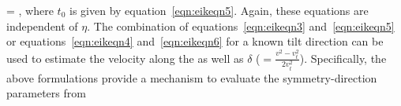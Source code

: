 \beqa
{} =  ,
\label{eqn:eikeqn6}
\eeqa
where $t_0$ is given by equation~\ref{eqn:eikeqn5}.
Again, these equations are independent of $\eta$. The combination of equations~\ref{eqn:eikeqn3} and~\ref{eqn:eikeqn5}
or equations~\ref{eqn:eikeqn4} and~\ref{eqn:eikeqn6} for a known tilt direction can
be used to estimate the velocity along the  
 as well as $\delta$ ($=\frac{v^{2}-v_{t}^{2}}{2 v_{t}^{2}}$). Specifically, the above formulations provide a
mechanism to evaluate the symmetry-direction  parameters from 

\begin{comment}
In fact, we had to evaluate the fourth-order traveltime derivative,
\beqa
 \frac{\partial^{4} t}{\partial x^{4}}(x=0,z) &=& \frac{z}{v_{t}} 
 \frac{12}{v^2 z^4 \left(v^2 \left(-\sin ^2\theta-2\right)+v_t^2 \sin ^2\theta\right)^5}	\nonumber \\
& & \left(16 v_t^4 v^8 (8 \eta +1)-32 \left(v^{2}-v_t^{2}\right) v_t^2 v^6 \left(2 v^2-5 v_t^2 (2 \eta +1)\right) \sin ^2(\theta
   ) \right. \nonumber \\
& &   \left. -\left(v^2-v_t^2\right)^4 \left(32 v^4-96 v_t^2 v^2+3 v_t^4 (29-48 \eta )\right) \sin ^8\theta \right. \nonumber \\
& &   \left. +8 \left(v^2-v_t^2\right)^3 v^2
   \left(8 v^4-26 v_t^2 v^2+3 v_t^4 (26 \eta +3)\right) \sin ^6\theta \right. \nonumber \\
& &   \left. +8 \left(v^2-v_t^2\right)^2 v^4 \left(16 v^4-72 v_t^2 v^2+5
   v_t^4 (20 \eta +11)\right) \sin ^4\theta \right),
\label{eqn:eikeqn5}
\eeqa
to start seeing dependency on $\eta$. Note that we are using the traveltime
expansions in terms of medium parameters ($\eta$ and $\theta$) to estimate the expansion
with respect to offset, $x$. 
\end{comment}

